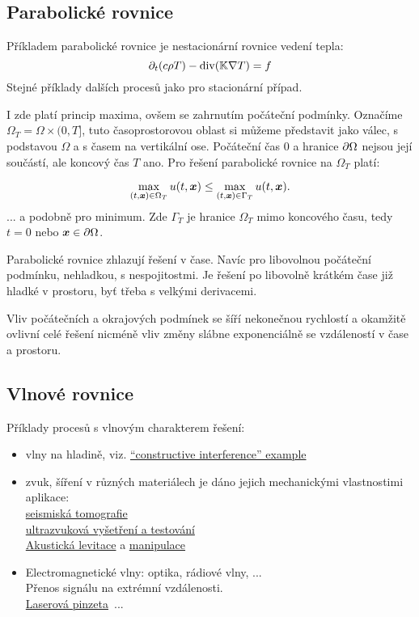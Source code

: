 \subsection{Parabolické rovnice}
Příkladem parabolické rovnice je nestacionární rovnice vedení tepla:
\[
    \partial_t(c \rho T) -\operatorname{div}({\mathbb{K}} \nabla T) = f
\]
Stejné příklady dalších procesů jako pro stacionární případ.

I zde platí princip maxima, ovšem se zahrnutím počáteční podmínky.
Označíme $\Omega_T = \Omega \times (0, T]$, tuto časoprostorovou oblast 
si můžeme představit jako válec, s podstavou $\Omega$ a s časem na vertikální ose. 
Počáteční čas $0$ a hranice $\partial \Omega$ nejsou její součástí, ale koncový čas $T$
ano. Pro řešení parabolické rovnice na $\Omega_T$ platí:

\[
    \max_{(t, \mathbf{\boldsymbol{x}}) \in \Omega_T} u(t, \mathbf{\boldsymbol{x}}) \le \max_{(t, \mathbf{\boldsymbol{x}}) \in \Gamma_T}  u(t, \mathbf{\boldsymbol{x}}).
\]
... a podobně pro minimum. Zde $\Gamma_T$ je hranice $\Omega_T$ mimo koncového času, tedy 
$t=0$ nebo $\mathbf{\boldsymbol{x}} \in \partial \Omega$.

Parabolické rovnice zhlazují řešení v čase. Navíc pro libovolnou počáteční podmínku, nehladkou, s nespojitostmi. Je řešení po libovolně krátkém
čase již hladké v prostoru, byť třeba s velkými derivacemi. 

Vliv počátečních a okrajových podmínek se šíří nekonečnou rychlostí a okamžitě ovlivní celé řešení
nicméně vliv změny slábne exponenciálně se vzdáleností v čase a prostoru.
  
\subsection{Vlnové rovnice}
Příklady procesů s vlnovým charakterem řešení:
  \begin{itemize}
    \item vlny na hladině, viz. 
    \href{https://www.youtube.com/watch?v=6EKZKaWhufI}{``constructive interference'' example}
    \item zvuk, šíření v různých materiálech je dáno jejich mechanickými vlastnostimi\\
          aplikace:\\
          \href{https://en.wikipedia.org/wiki/Seismic_tomography}{seismiská tomografie}\\
          \href{https://en.wikipedia.org/wiki/Ultrasonic_testing}{ultrazvuková vyšetření a testování}\\
          \href{https://en.wikipedia.org/wiki/Acoustic_levitation}{Akustická levitace}
          a \href{https://www.youtube.com/watch?v=c05VSs3q56U&t=140s}{manipulace}\\
    \item Electromagnetické vlny: optika, rádiové vlny, ...\\
    Přenos signálu na extrémní vzdálenosti.\\
\href{https://en.wikipedia.org/wiki/Optical_tweezers}{Laserová pinzeta}\
     ...
     \end{itemize}

